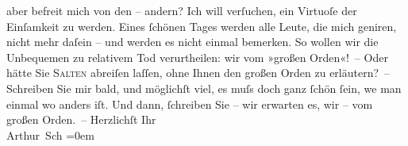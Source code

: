 \begin{ledgroupsized}[t]{13cm}
                    aber befreit mich von den – andern? \pend
           \pstart
           Ich will verſuchen, ein Virtuoſe der Einſamkeit zu werden. Eines ſchönen Tages
                    werden alle Leute, die mich geniren, {\pb}nicht mehr daſein
                    – und werden es nicht einmal bemerken. So wollen wir die Unbequemen zu relativem
                    Tod verurtheilen: wir vom »großen Orden«! – Oder hätte Sie \textsc{Salten} abreiſen laſſen, ohne Ihnen den großen Orden zu erläutern? –\pend
           \pstart
           Schreiben Sie mir bald, und möglichſt viel, es muſs doch ganz ſchön ſein, we{\geminationn}
                    man einmal wo anders iſt. Und dann, ſchreiben Sie – wir erwarten es, wir – vom
                    großen Orden. –\pend
           \pstart
           {\pb}Herzlichſt Ihr{\\[\baselineskip]}\spacefill\mbox{Arthur Sch}\pend
           \leftskip=0em{}\endnumbering{}\end{ledgroupsized}  \newcommand{\dateiname}{L00079}\newcommand{\titel}{Arthur Schnitzler an Richard Beer-Hofmann, 11. 3. 1892}\newcommand{\editorInnen}{ Martin Anton Müller und Gerd-Hermann Susen}
            \footnotesize
\begin{ledgroupsized}[t]{11.5cm}
\end{ledgroupsized}
         
      